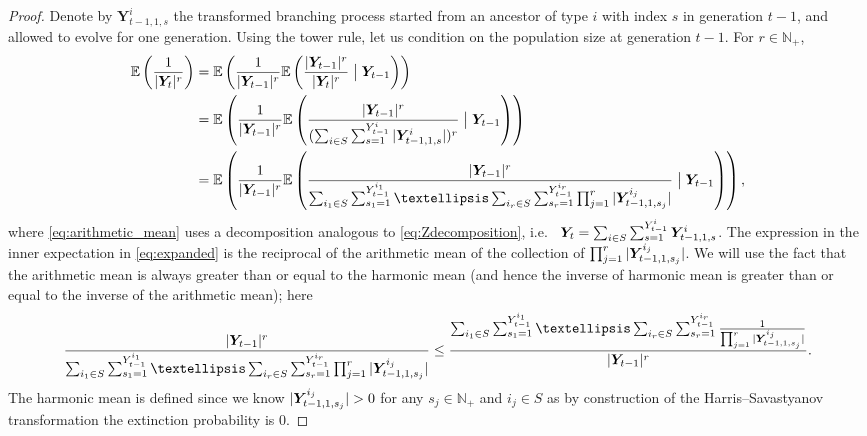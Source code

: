 \documentclass[10pt,a4paper]{amsart}
\newcommand{\Y}[1][]{%
  \ifx\relax#1\relax
    \boldsymbol{Y}_{t-1, 1, s}^{i}%
  \else
    \boldsymbol{Y}_{t-1, 1, s_{#1}}^{i_{#1}}%
  \fi
}
\begin{document}
\begin{proof}
Denote by $\boldsymbol{Y}_{t-1, 1, s}^i$ the transformed branching process started from an ancestor of type $i$ with index $s$ in generation $t-1$, and allowed to evolve for one generation. Using the tower rule, let us condition on the population size at generation $t-1$. For $r \in \mathbb{N}_+$,
\begin{align}
    \mathbb{E}\left(\frac{1}{|\boldsymbol{Y}_t|^r}\right) %
    &= \mathbb{E}\left(\frac{1}{|\boldsymbol{Y}_{t-1}|^r}\mathbb{E}\left(\frac{|\boldsymbol{Y}_{t-1}|^r}{|\boldsymbol{Y}_t|^r}\bigm| \boldsymbol{Y}_{t-1}\right)\right) \nonumber \\
    &= \mathbb{E}\left(\frac{1}{|\boldsymbol{Y}_{t-1}|^r}\mathbb{E}\left(\frac{|\boldsymbol{Y}_{t-1}|^r}{(\sum_{i \in S}\sum_{s=1}^{Y_{t-1}^i}|\Y|)^r}\bigm| \boldsymbol{Y}_{t-1}\right)\right) \label{eq:arithmetic_mean} \\
    &= \mathbb{E}\left(\frac{1}{|\boldsymbol{Y}_{t-1}|^r}\mathbb{E}\left(\frac{|\boldsymbol{Y}_{t-1}|^r}{\sum_{i_1 \in S}\sum_{s_1=1}^{Y_{t-1}^{i_1}} \dots \sum_{i_r \in S}\sum_{s_r=1}^{Y_{t-1}^{i_r}}\prod_{j=1}^r|\Y[j]|}\bigm| \boldsymbol{Y}_{t-1}\right)\right), \label{eq:expanded} 
\end{align}
where \eqref{eq:arithmetic_mean} uses a decomposition analogous to \eqref{eq:Zdecomposition}, i.e.\ 
$
\boldsymbol{Y}_t = \sum_{i \in S}\sum_{s=1}^{Y_{t-1}^i}\Y
$.
The expression in the inner expectation in \eqref{eq:expanded} is the reciprocal of the arithmetic mean of the collection of $\prod_{j=1}^r|\Y[j]\vert$.
We will use the fact that the arithmetic mean is always greater than or equal to the harmonic mean (and hence the inverse of harmonic mean is greater than or equal to the inverse of the arithmetic mean);
here
\begin{equation}
   \frac{|\boldsymbol{Y}_{t-1}|^r}{\sum_{i_1 \in S}\sum_{s_1=1}^{Y_{t-1}^{i_1}} \dots \sum_{i_r \in S}\sum_{s_r=1}^{Y_{t-1}^{i_r}}\prod_{j=1}^r|\Y[j]|} 
   \le \frac{\sum_{i_1 \in S}\sum_{s_1=1}^{Y_{t-1}^{i_1}} \dots \sum_{i_r \in S}\sum_{s_r=1}^{Y_{t-1}^{i_r}}\frac{1}{\prod_{j=1}^r|\Y[j]|}}{|\boldsymbol{Y}_{t-1}|^r}. \label{eq:harmonic_arithmetic}
\end{equation}
The harmonic mean is defined since we know $|\Y[j]| > 0 $ for any $s_j \in \mathbb{N}_+$ and $i_j \in S$ as by construction of the Harris--Savastyanov transformation the extinction probability is 0.


\end{proof}
\end{document}
